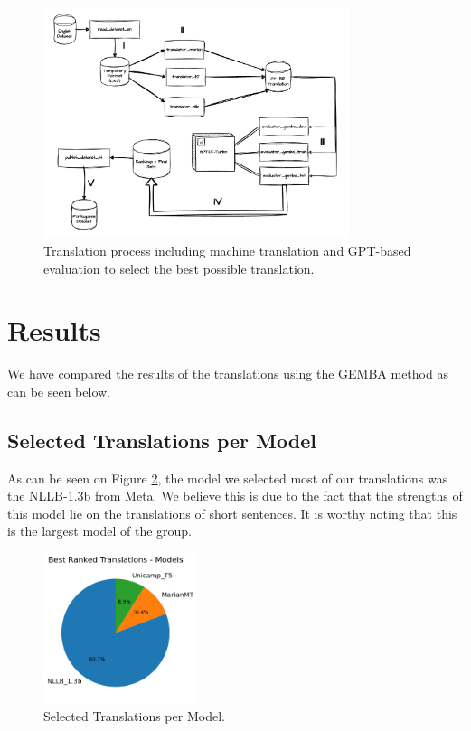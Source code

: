 \documentclass{article}
\begin{document}
\begin{figure}[htbp]
    \centering
    \includegraphics[width=0.8\textwidth]{drawio/translation.drawio.pdf}
    \caption{\label{fig:diagram}Translation process including machine
    translation and GPT-based evaluation to select the best possible
    translation.}
\end{figure}

\section{Results}

We have compared the results of the translations using the GEMBA method as can be seen below.

\subsection{Selected Translations per Model}

As can be seen on Figure \ref{fig:pie}, the model we selected most of our
translations was the NLLB-1.3b from Meta. We believe this is due to the fact
that the strengths of this model lie on the translations of short sentences. It
is worthy noting that this is the largest model of the group.

\begin{figure}[htbp]
    \centering
    \includegraphics[width=0.4\textwidth]{figures/pie-chart.png}
    \caption{\label{fig:pie}Selected Translations per Model.}
\end{figure}
\FloatBarrier
\end{document}
